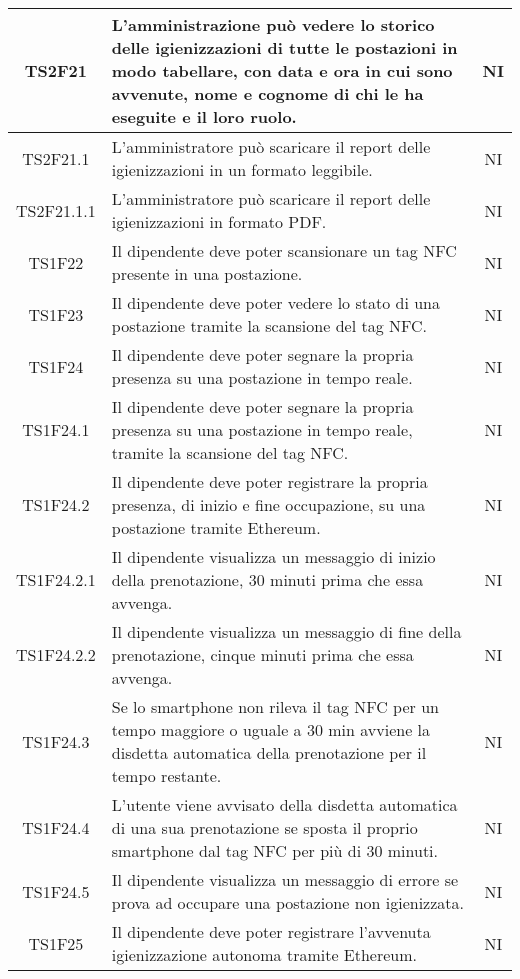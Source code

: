 \begin{center}
\begin{longtable}{|c|p{10cm}|c|}
			\hline
			TS2F21 & L'amministrazione può vedere lo storico delle igienizzazioni di tutte le postazioni in modo tabellare, con data e ora in cui sono avvenute, nome e cognome di chi le ha eseguite e il loro ruolo. & NI \\	
			\hline
			TS2F21.1 & L'amministratore può scaricare il report delle igienizzazioni in un formato leggibile. & NI \\	
			\hline
			TS2F21.1.1 & L'amministratore può scaricare il report delle igienizzazioni in formato PDF. & NI \\	
			\hline			
			TS1F22 & Il dipendente deve poter scansionare un tag NFC presente in una postazione. & NI \\	
			\hline
			TS1F23 & Il dipendente deve poter vedere lo stato di una postazione tramite la scansione del tag NFC. & NI \\	
			\hline
			TS1F24 & Il dipendente deve poter segnare la propria presenza su una postazione in tempo reale. & NI \\	
			\hline			
			TS1F24.1 & Il dipendente deve poter segnare la propria presenza su una postazione in tempo reale, tramite la scansione del tag NFC. & NI \\	
			\hline
			TS1F24.2 & Il dipendente deve poter registrare la propria presenza, di inizio e fine occupazione, su una postazione tramite Ethereum. & NI \\	
			\hline			
			TS1F24.2.1 & Il dipendente visualizza un messaggio di inizio della prenotazione, 30 minuti prima che essa avvenga. & NI \\	
			\hline						
			TS1F24.2.2 & Il dipendente visualizza un messaggio di fine della prenotazione, cinque minuti prima che essa avvenga. & NI \\	
			\hline					
			TS1F24.3 & Se lo smartphone non rileva il tag NFC per un tempo maggiore o uguale a 30 min avviene la disdetta automatica della prenotazione per il tempo restante. & NI \\	
			\hline				
			TS1F24.4 & L’utente viene avvisato della disdetta automatica di una sua prenotazione se sposta il proprio smartphone dal tag NFC per più di 30 minuti. & NI \\	
			\hline				
			TS1F24.5 & Il dipendente visualizza un messaggio di errore se prova ad occupare una postazione non igienizzata. & NI \\	
			\hline
			TS1F25 & Il dipendente deve poter registrare l'avvenuta igienizzazione autonoma tramite Ethereum. & NI \\	
			\hline

\end{longtable}
\end{center}
